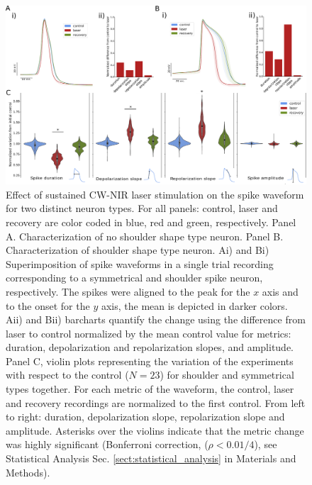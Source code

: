 \begin{figure}[htb!]
	\centering
	\includegraphics[width=\textwidth]{img/laser/Figure2.pdf}
	\caption{Effect of sustained CW-NIR laser stimulation on the spike waveform for two distinct neuron types. For all panels: control, laser and recovery are color coded in blue, red and green, respectively. Panel A. Characterization of no shoulder shape type neuron. Panel B. Characterization of shoulder shape type neuron. Ai) and Bi) Superimposition of spike waveforms in a single trial recording corresponding to a symmetrical and shoulder spike neuron, respectively. The spikes were aligned to the peak for the $x$ axis and to the onset for the $y$ axis, the mean is depicted in darker colors. Aii) and Bii) barcharts quantify the change using the difference from laser to control normalized by the mean control value for metrics: duration, depolarization and repolarization slopes, and amplitude. Panel C, violin plots representing the variation of the experiments with respect to the control ($N=23$) for shoulder and symmetrical types together. For each metric of the waveform, the control, laser and recovery recordings are normalized to the first control. From left to right: duration, depolarization slope, repolarization slope and amplitude. Asterisks over the violins indicate that the metric change was highly significant (Bonferroni correction, ($\rho<0.01/4$), see Statistical Analysis Sec. \ref{sect:statistical_analysis} in Materials and Methods).}
	\label{fig:continuous_results_panel}
\end{figure}

